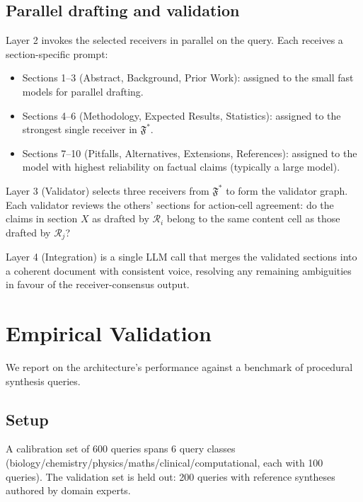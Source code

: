 \documentclass[11pt,twocolumn,a4paper]{article}
\theoremstyle{definition}
\theoremstyle{remark}
\newcommand{\Federation}{\mathfrak{F}}
\newcommand{\receiver}{\mathcal{R}}
\begin{document}
\subsection{Parallel drafting and validation}

Layer 2 invokes the selected receivers in parallel on the query. Each receives a section-specific prompt:

\begin{itemize}[leftmargin=*,nosep]
\item Sections 1--3 (Abstract, Background, Prior Work): assigned to the small fast models for parallel drafting.
\item Sections 4--6 (Methodology, Expected Results, Statistics): assigned to the strongest single receiver in $\Federation^*$.
\item Sections 7--10 (Pitfalls, Alternatives, Extensions, References): assigned to the model with highest reliability on factual claims (typically a large model).
\end{itemize}

Layer 3 (Validator) selects three receivers from $\Federation^*$ to form the validator graph. Each validator reviews the others' sections for action-cell agreement: do the claims in section $X$ as drafted by $\receiver_i$ belong to the same content cell as those drafted by $\receiver_j$?

Layer 4 (Integration) is a single LLM call that merges the validated sections into a coherent document with consistent voice, resolving any remaining ambiguities in favour of the receiver-consensus output.


\section{Empirical Validation}
\label{sec:validation}

We report on the architecture's performance against a benchmark of procedural synthesis queries.

\subsection{Setup}

A calibration set of 600 queries spans 6 query classes (biology/chemistry/physics/maths/clinical/computational, each with 100 queries). The validation set is held out: 200 queries with reference syntheses authored by domain experts.
\end{document}

